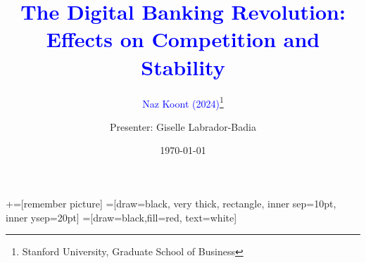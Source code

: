 \documentclass[notes,10pt, aspectratio=169]{beamer}
\title[]{\textcolor{blue}{The Digital Banking Revolution: \\
Effects on Competition and Stability}} %
\subtitle{\textcolor{blue}{Naz Koont (2024)}\footnote{
 Stanford University, Graduate School of Business
}}
\author{Presenter: Giselle Labrador-Badia}
\institute{University of Wisconsin-Madison}
\date{\today}
\begin{document}
\newcommand\marktopleft[1]{%
 \tikz[overlay,remember picture] 
 \node (marker-#1-a) at (-.3em,.3em) {};%
}
\newcommand\markbottomright[2]{%
 \tikz[overlay,remember picture] 
 \node (marker-#1-b) at (0em,0em) {};%
}
+=[remember picture] 
 =[draw=black, very thick, rectangle, inner sep=10pt, inner ysep=20pt]
 =[draw=black,fill=red, text=white]

\begin{frame}[noframenumbering]
 \maketitle
\end{frame}
\end{document}
